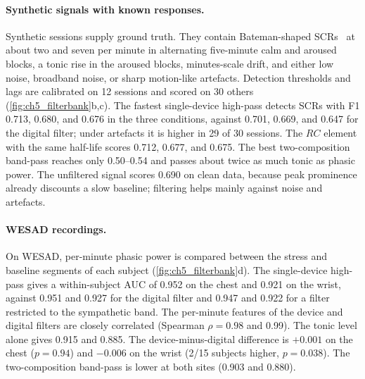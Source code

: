 \documentclass[12pt, twoside]{report}
\begin{document}
\paragraph{Synthetic signals with known responses.} Synthetic sessions supply ground truth. They contain Bateman-shaped SCRs~\cite{BenedekKaernbach2010} at about two and seven per minute in alternating five-minute calm and aroused blocks, a tonic rise in the aroused blocks, minutes-scale drift, and either low noise, broadband noise, or sharp motion-like artefacts. Detection thresholds and lags are calibrated on 12 sessions and scored on 30 others (\cref{fig:ch5_filterbank}b,c). The fastest single-device high-pass detects SCRs with F1 \num{0.713}, \num{0.680}, and \num{0.676} in the three conditions, against \num{0.701}, \num{0.669}, and \num{0.647} for the digital filter; under artefacts it is higher in 29 of 30 sessions. The $RC$ element with the same half-life scores \num{0.712}, \num{0.677}, and \num{0.675}. The best two-composition band-pass reaches only \numrange{0.50}{0.54} and passes about twice as much tonic as phasic power. The unfiltered signal scores \num{0.690} on clean data, because peak prominence already discounts a slow baseline; filtering helps mainly against noise and artefacts.

\paragraph{WESAD recordings.} On WESAD, per-minute phasic power is compared between the stress and baseline segments of each subject (\cref{fig:ch5_filterbank}d). The single-device high-pass gives a within-subject AUC of \num{0.952} on the chest and \num{0.921} on the wrist, against \num{0.951} and \num{0.927} for the digital filter and \num{0.947} and \num{0.922} for a filter restricted to the sympathetic band. The per-minute features of the device and digital filters are closely correlated (Spearman \(\rho=\num{0.98}\) and \num{0.99}). The tonic level alone gives \num{0.915} and \num{0.885}. The device-minus-digital difference is \(+\num{0.001}\) on the chest (\(p=\num{0.94}\)) and \(-\num{0.006}\) on the wrist (2/15 subjects higher, \(p=\num{0.038}\)). The two-composition band-pass is lower at both sites (\num{0.903} and \num{0.880}).
\end{document}
